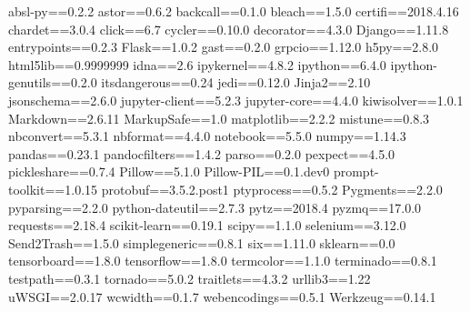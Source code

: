 absl-py==0.2.2
astor==0.6.2
backcall==0.1.0
bleach==1.5.0
certifi==2018.4.16
chardet==3.0.4
click==6.7
cycler==0.10.0
decorator==4.3.0
Django==1.11.8
entrypoints==0.2.3
Flask==1.0.2
gast==0.2.0
grpcio==1.12.0
h5py==2.8.0
html5lib==0.9999999
idna==2.6
ipykernel==4.8.2
ipython==6.4.0
ipython-genutils==0.2.0
itsdangerous==0.24
jedi==0.12.0
Jinja2==2.10
jsonschema==2.6.0
jupyter-client==5.2.3
jupyter-core==4.4.0
kiwisolver==1.0.1
Markdown==2.6.11
MarkupSafe==1.0
matplotlib==2.2.2
mistune==0.8.3
nbconvert==5.3.1
nbformat==4.4.0
notebook==5.5.0
numpy==1.14.3
pandas==0.23.1
pandocfilters==1.4.2
parso==0.2.0
pexpect==4.5.0
pickleshare==0.7.4
Pillow==5.1.0
Pillow-PIL==0.1.dev0
prompt-toolkit==1.0.15
protobuf==3.5.2.post1
ptyprocess==0.5.2
Pygments==2.2.0
pyparsing==2.2.0
python-dateutil==2.7.3
pytz==2018.4
pyzmq==17.0.0
requests==2.18.4
scikit-learn==0.19.1
scipy==1.1.0
selenium==3.12.0
Send2Trash==1.5.0
simplegeneric==0.8.1
six==1.11.0
sklearn==0.0
tensorboard==1.8.0
tensorflow==1.8.0
termcolor==1.1.0
terminado==0.8.1
testpath==0.3.1
tornado==5.0.2
traitlets==4.3.2
urllib3==1.22
uWSGI==2.0.17
wcwidth==0.1.7
webencodings==0.5.1
Werkzeug==0.14.1
